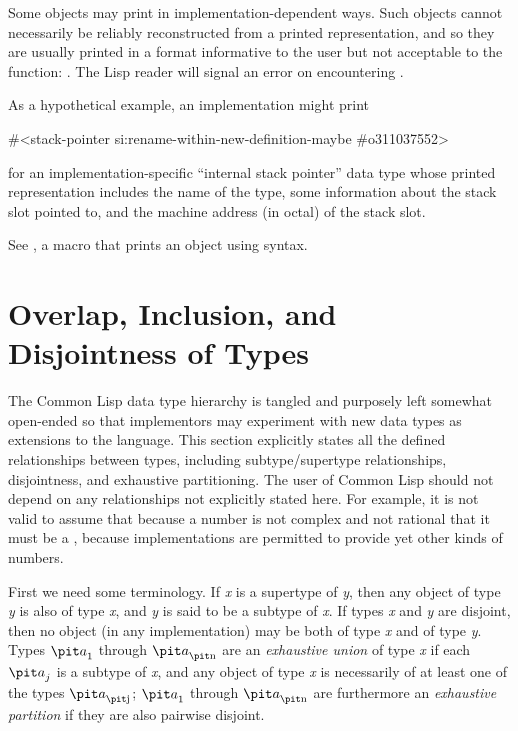 {Some objects may print in implementation-dependent ways.
Such objects cannot necessarily be reliably reconstructed from
a printed representation, and so they are usually printed in
a format informative to the user but not acceptable to the  function:
.
The Lisp reader will signal an error on encountering \cd{\#<}.

As a hypothetical example, an implementation might print
\begin{lisp}
\#<stack-pointer si:rename-within-new-definition-maybe \#o311037552>
\end{lisp}
for an implementation-specific ``internal stack pointer'' data type
whose printed representation includes the name of the type,
some information about the stack slot pointed to, and the machine address
(in octal) of the stack slot.

\begin{newer}
See , a macro that prints an object using \cd{\#<}
syntax.
\end{newer}

\section{Overlap, Inclusion, and Disjointness of Types}
\label{DATA-TYPE-RELATIONSHIPS}

The Common Lisp data type hierarchy is tangled and purposely left somewhat
open-ended so that implementors may experiment with new data types
as extensions to the language.  This section explicitly states all
the defined relationships between types, including subtype/supertype
relationships,
disjointness, and exhaustive partitioning.  The user of Common Lisp
should not depend on any relationships not explicitly stated here.
For example, it is not valid to assume that because a number
is not complex and not rational that it must be a , because
implementations are permitted to provide yet other kinds of numbers.

First we need some terminology.
If {\it x} is a supertype of {\it y}, then any object of type {\it y} is also
of type {\it x}, and {\it y} is said to be a subtype of {\it x}.  If types
{\it x} and {\it y} are disjoint, then no object (in any implementation) may
be both of type {\it x} and of type {\it y}.  Types ${\it a}_1$ through
${\it a}_{\hbox{\scriptsize\it n}}$ are an {\it exhaustive union}
of type {\it x} if each ${\it a}_j$
is a subtype of {\it x}, and any object of type {\it x} is
necessarily of at least one of the types ${\it a}_{\hbox{\scriptsize\it j}}$;
${\it a}_1$ through ${\it a}_{\hbox{\scriptsize\it n}}$ are furthermore an {\it exhaustive partition}
if they are also pairwise disjoint.

}
